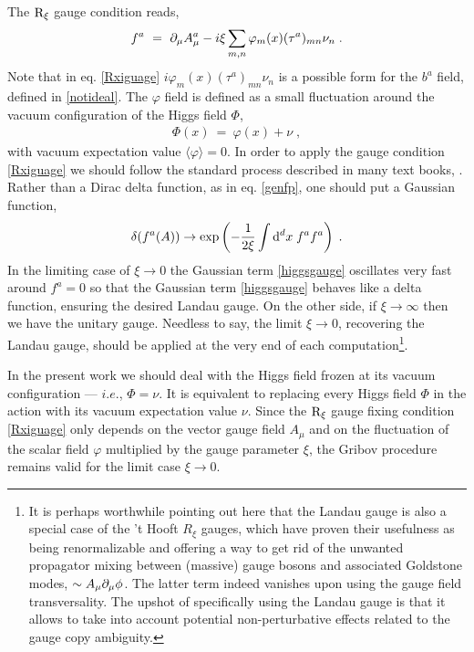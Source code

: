 The $\mathrm{R}_{\xi}$ gauge condition reads,
\begin{eqnarray}
f^{a} ~=~ \partial_{\mu}A^{a}_{\mu} -i\xi  \sum_{m,n} \varphi_{m}(x)(\tau^{a})_{mn} \nu_{n}   \;.
\label{Rxiguage}
\end{eqnarray}
Note that in eq. \eqref{Rxiguage} $i\varphi_{m}(x)(\tau^{a})_{mn} \nu_{n}$ is a possible form for the $b^{a}$ field, defined in \eqref{notideal}. The $\varphi$ field is defined as a small fluctuation around the vacuum configuration of the Higgs field $\Phi$,
\begin{eqnarray}
\Phi(x) ~=~ \varphi(x) + \nu  \;,
\end{eqnarray}
with vacuum expectation value $\langle \varphi \rangle = 0$. In order to apply the gauge condition \eqref{Rxiguage} we should follow the standard process described in many text books, \cite{Weinberg:1996kr,Peskin:1995ev,Srednicki:2007qs}. Rather than a Dirac delta function, as in eq. \eqref{genfp}, one should put a Gaussian function,
\begin{eqnarray}
\delta(f^{a}(A)) \to \exp \left( -\frac{1}{2\xi}\int \mathrm{d}^{d}x\; f^{a}f^{a} \right)   \;.
\label{higgsgauge}
\end{eqnarray}
In the limiting case of $\xi \to 0$ the Gaussian term \eqref{higgsgauge} oscillates very fast
around $f^{a} =0$ so that the Gaussian term \eqref{higgsgauge} behaves like a delta function,
ensuring the desired Landau gauge. On the other side, if $\xi \to \infty$ then we have the
unitary gauge. Needless to say, the limit $\xi \to 0$, recovering the Landau gauge, should be
applied at the very end of each computation\footnote{It is perhaps worthwhile pointing out here
that the Landau gauge is also a special case of the 't Hooft $R_\xi$ gauges, which have proven
their usefulness as being renormalizable and offering a way to get rid of the unwanted
propagator mixing between (massive) gauge bosons and associated Goldstone modes, $\sim A_\mu
\partial_\mu \phi$. The latter term indeed vanishes upon using the gauge field transversality. The
upshot of specifically using the Landau gauge is that it allows to take into account potential
non-perturbative effects related to the gauge copy ambiguity.}.

In the present work we should deal with the Higgs field frozen at its vacuum configuration --- $i.e.$, $\Phi = \nu$. It is equivalent to replacing every Higgs field $\Phi$ in the action with its vacuum expectation value $\nu$. Since the $\mathrm{R}_{\xi}$ gauge fixing condition \eqref{Rxiguage} only depends on the vector gauge field $A_{\mu}$ and on the fluctuation of the scalar field $\varphi$ multiplied by the gauge parameter $\xi$, the Gribov procedure remains valid for the limit case $\xi \to 0$.
















